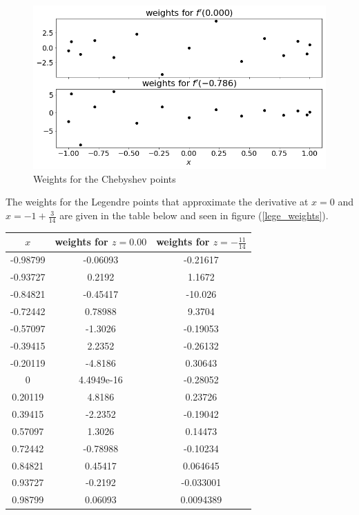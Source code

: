 \documentclass[12pt]{article}
\begin{document}
\begin{figure}[H]
	\caption{Weights for the Chebyshev points}
	\label{cheb_weights}
	\includegraphics[width=.9\textwidth]{hw1_p4b_cheb_weights}
	\centering
\end{figure}

The weights for the Legendre points that approximate the derivative at $x=0$ and $x=-1+\tfrac{3}{14}$ are given in the table below and seen in figure (\ref{lege_weights}). 
\begin{center}
	\begin{tabular}{|c|c|c|}
		\hline
		$x$&weights for $z=0.00$&weights for $z=-\tfrac{11}{14}$\\ \hline
		-0.98799&-0.06093&-0.21617\\ \hline
		-0.93727&0.2192&1.1672\\ \hline
		-0.84821&-0.45417&-10.026\\ \hline
		-0.72442&0.78988&9.3704\\ \hline
		-0.57097&-1.3026&-0.19053\\ \hline
		-0.39415&2.2352&-0.26132\\ \hline
		-0.20119&-4.8186&0.30643\\ \hline
		0&4.4949e-16&-0.28052\\ \hline
		0.20119&4.8186&0.23726\\ \hline
		0.39415&-2.2352&-0.19042\\ \hline
		0.57097&1.3026&0.14473\\ \hline
		0.72442&-0.78988&-0.10234\\ \hline
		0.84821&0.45417&0.064645\\ \hline
		0.93727&-0.2192&-0.033001\\ \hline
		0.98799&0.06093&0.0094389\\ \hline
	\end{tabular}
\end{center}
\end{document}
